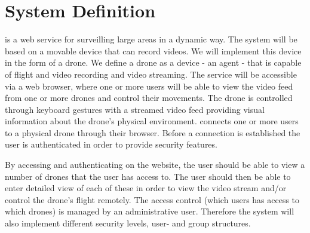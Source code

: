 \section{System Definition}
\projectname{} is a web service for surveilling large areas in a dynamic way. 
The system will be based on a movable device that can record videos. 
We will implement this device in the form of a drone. 
We define a drone as a device - an agent - that is capable of flight and video recording and video streaming.
The service will be accessible via a web browser, where one or more users will be able to view the video feed from one or more drones and control their movements. 
The drone is controlled through keyboard gestures with a streamed video feed providing visual information about the drone's physical environment. 
\projectname{} connects one or more users to a physical drone through their browser. 
Before a connection is established the user is authenticated in order to provide security features.

By accessing and authenticating on the website, the user should be able to view a number of drones that the user has access to.
The user should then be able to enter detailed view of each of these in order to view the video stream and/or control the drone's flight remotely. 
The access control (which users has access to which drones) is managed by an administrative user.
Therefore the system will also implement different security levels, user- and group structures. 
